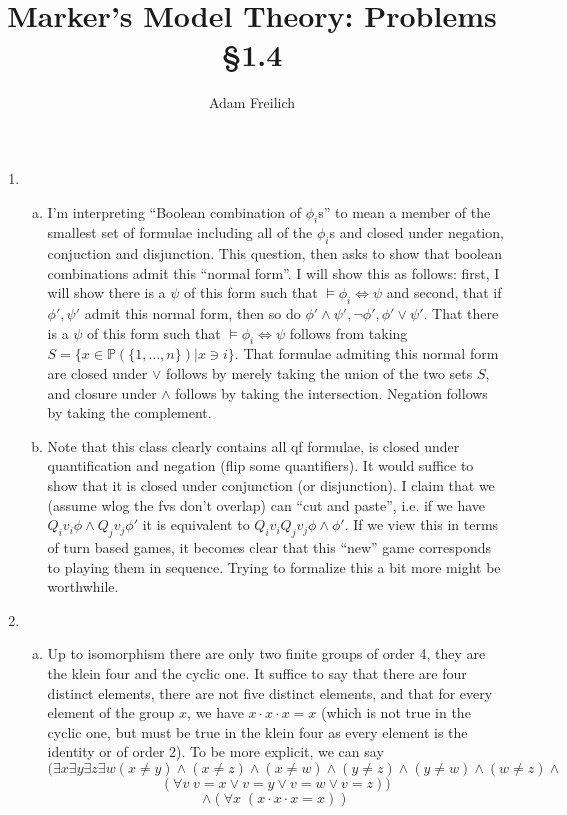 \documentclass[10pt]{article}
\author{Adam Freilich}
\title{Marker's Model Theory: Problems \S 1.4}
\newcommand{\A}{\forall}
\newcommand{\E}{\exists}
\begin{document}
\maketitle

\begin{enumerate}[1.]
\item 
	\begin{enumerate}[a)] 
	\item I'm interpreting ``Boolean combination of $\phi_i$s'' to mean a member of the smallest set of formulae including all of the $\phi_i$s and closed under negation, conjuction and disjunction. This question, then asks to show that boolean combinations admit this ``normal form''. I will show this as follows: first, I will show there is a $\psi$ of this form such that $\models \phi_i \iff \psi$ and second, that if $\phi', \psi'$ admit this normal form, then so do $\phi' \land \psi', \neg \phi', \phi' \lor \psi'$. That there is a $\psi$ of this form such that $\models \phi_i \iff \psi$ follows from taking $S = \{x \in \mathbb{P}(\{1, \ldots, n\}) | x \ni i\}$. That formulae admiting this normal form are closed under $\lor$ follows by merely taking the union of the two sets $S$, and closure under $\land$ follows by taking the intersection. Negation follows by taking the complement. 
	
	\item Note that this class clearly contains all qf formulae, is closed under quantification and negation (flip some quantifiers). It would suffice to show that it is closed under conjunction (or disjunction). I claim that we (assume wlog the fvs don't overlap) can ``cut and paste'', i.e. if we have \(Q_i v_i \phi \land Q_j v_j \phi'\) it is equivalent to \(Q_i v_i Q_j v_j \phi \land \phi'\). If we view this in terms of turn based games, it becomes clear that this ``new'' game corresponds to playing them in sequence. Trying to formalize this a bit more might be worthwhile. 

	\end{enumerate}

\item  
	\begin{enumerate}[a)] 
	\item
	Up to isomorphism there are only two finite groups of order 4, they are the klein four and the cyclic one. It suffice to say that there are four distinct elements, there are not five distinct elements, and that for every element of the group $x$, we have $x \cdot x \cdot x = x$ (which is not true in the cyclic one, but must be true in the klein four as every element is the identity or of order 2). To be more explicit, we can say \[(\E x \E y \E z \E w (x \neq y) \land  (x \neq z)\land  (x \neq w)\land  (y \neq z)\land  (y \neq w) \land  (w \neq z) \land\]\[ (\A v \; v = x \lor v = y \lor v = w \lor v = z))\]\[ \land (\A x \; (x \cdot x \cdot x = x))\]
	

\end{enumerate}
\end{enumerate}
\end{document}
